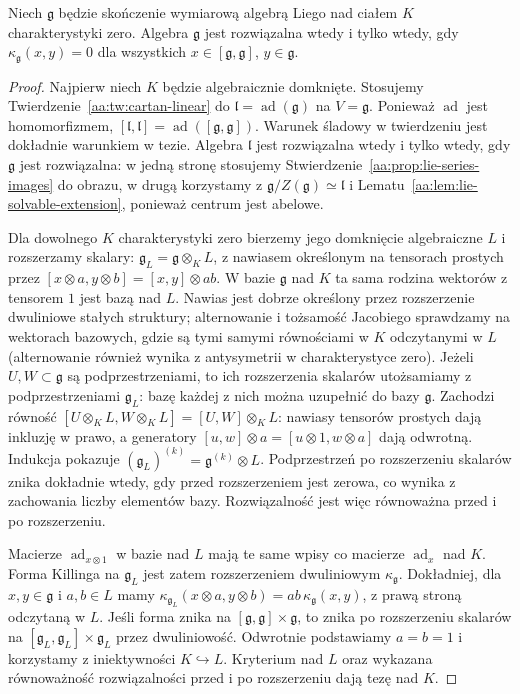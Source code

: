 \begin{twierdzenie}
\label{aa:tw:cartan-solvability}
Niech $\mathfrak g$ będzie skończenie wymiarową algebrą
Liego nad ciałem $K$ charakterystyki zero.
Algebra $\mathfrak g$ jest rozwiązalna wtedy i tylko
wtedy, gdy $\kappa_{\mathfrak g}(x,y)=0$
dla wszystkich $x\in[\mathfrak g,\mathfrak g]$,
$y\in\mathfrak g$.
\end{twierdzenie}
\begin{proof}
Najpierw niech $K$ będzie algebraicznie domknięte.
Stosujemy Twierdzenie~\ref{aa:tw:cartan-linear}
do $\mathfrak l=\operatorname{ad}(\mathfrak g)$
na $V=\mathfrak g$. Ponieważ $\operatorname{ad}$
jest homomorfizmem,
$[\mathfrak l,\mathfrak l]=
\operatorname{ad}([\mathfrak g,\mathfrak g])$.
Warunek śladowy w twierdzeniu jest dokładnie
warunkiem w tezie. Algebra $\mathfrak l$ jest
rozwiązalna wtedy i tylko wtedy, gdy $\mathfrak g$
jest rozwiązalna: w jedną stronę stosujemy
Stwierdzenie~\ref{aa:prop:lie-series-images} do obrazu,
w drugą korzystamy z
$\mathfrak g/Z(\mathfrak g)\simeq\mathfrak l$
i Lematu~\ref{aa:lem:lie-solvable-extension}, ponieważ
centrum jest abelowe.

Dla dowolnego $K$ charakterystyki zero bierzemy
jego domknięcie algebraiczne $L$ i rozszerzamy
skalary: $\mathfrak g_L=\mathfrak g\otimes_K L$,
z nawiasem określonym na tensorach prostych przez
$[x\otimes a,y\otimes b]=[x,y]\otimes ab$.
W bazie $\mathfrak g$ nad $K$ ta sama rodzina
wektorów z tensorem $1$ jest bazą nad $L$.
Nawias jest dobrze określony przez rozszerzenie
dwuliniowe stałych struktury; alternowanie
i tożsamość Jacobiego sprawdzamy na wektorach
bazowych, gdzie są tymi samymi równościami w $K$
odczytanymi w $L$ (alternowanie również wynika
z antysymetrii w charakterystyce zero).
Jeżeli $U,W\subset\mathfrak g$ są podprzestrzeniami,
to ich rozszerzenia skalarów utożsamiamy z
podprzestrzeniami $\mathfrak g_L$: bazę każdej
z nich można uzupełnić do bazy $\mathfrak g$.
Zachodzi równość
$[U\otimes_K L,W\otimes_K L]=[U,W]\otimes_K L$:
nawiasy tensorów prostych dają inkluzję w prawo,
a generatory $[u,w]\otimes a=[u\otimes1,w\otimes a]$
dają odwrotną. Indukcja pokazuje
$(\mathfrak g_L)^{(k)}=\mathfrak g^{(k)}\otimes L$.
Podprzestrzeń po rozszerzeniu skalarów znika
dokładnie wtedy, gdy przed rozszerzeniem jest zerowa,
co wynika z zachowania liczby elementów bazy.
Rozwiązalność jest więc równoważna przed i po
rozszerzeniu.

Macierze $\operatorname{ad}_{x\otimes1}$ w bazie
nad $L$ mają te same wpisy co macierze
$\operatorname{ad}_x$ nad $K$. Forma Killinga
na $\mathfrak g_L$ jest zatem rozszerzeniem
dwuliniowym $\kappa_{\mathfrak g}$.
Dokładniej, dla $x,y\in\mathfrak g$ i $a,b\in L$
mamy $\kappa_{\mathfrak g_L}(x\otimes a,y\otimes b)
=ab\,\kappa_{\mathfrak g}(x,y)$, z prawą stroną
odczytaną w $L$. Jeśli forma znika na
$[\mathfrak g,\mathfrak g]\times\mathfrak g$,
to znika po rozszerzeniu skalarów na
$[\mathfrak g_L,\mathfrak g_L]\times\mathfrak g_L$
przez dwuliniowość. Odwrotnie podstawiamy
$a=b=1$ i korzystamy z iniektywności $K\hookrightarrow L$.
Kryterium nad $L$ oraz wykazana równoważność
rozwiązalności przed i po rozszerzeniu dają tezę nad $K$.
\end{proof}

